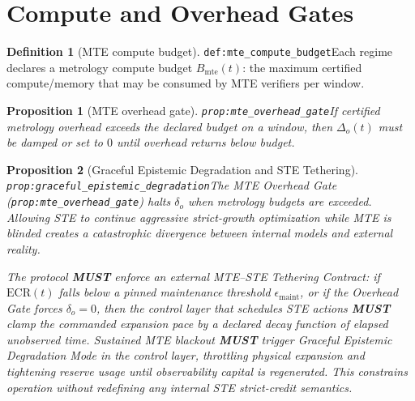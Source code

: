 \documentclass[11pt]{article}
\theoremstyle{definition}
\newtheorem{definition}{Definition}
\theoremstyle{plain}
\newtheorem{proposition}{Proposition}
\newcommand{\MUST}{\textbf{MUST}}
\newcommand{\STE}{\textsf{STE}}
\newcommand{\lbl}[1]{\texttt{\footnotesize\nolinkurl{#1}}}
\newcommand{\DefLabel}[1]{\hfill{\small\lbl{#1}}}
\newcommand{\deltao}{\Delta_o}
\begin{document}
\section{Compute and Overhead Gates}\label{sec:overhead}
\begin{definition}[MTE compute budget]\DefLabel{def:mte_compute_budget}\label{def:mte_compute_budget}
Each regime declares a metrology compute budget $B_{\mathrm{mte}}(t)$: the maximum certified compute/memory that may be consumed by MTE verifiers per window.
\end{definition}

\begin{proposition}[MTE overhead gate]\DefLabel{prop:mte_overhead_gate}\label{prop:mte_overhead_gate}
If certified metrology overhead exceeds the declared budget on a window, then $\deltao(t)$ must be damped or set to $0$ until overhead returns below budget.
\end{proposition}

\begin{proposition}[Graceful Epistemic Degradation and \STE{} Tethering]\DefLabel{prop:graceful_epistemic_degradation}\label{prop:graceful_epistemic_degradation}
The MTE Overhead Gate (\lbl{prop:mte_overhead_gate}) halts $\delta_o$ when metrology budgets are exceeded.
Allowing \STE{} to continue aggressive strict-growth optimization while MTE is blinded creates a catastrophic divergence between internal models and external reality.

The protocol \MUST{} enforce an external \emph{MTE--STE Tethering Contract}: if $\mathrm{ECR}(t)$ falls below a pinned maintenance threshold $\epsilon_{\mathrm{maint}}$, or if the Overhead Gate forces $\delta_o = 0$, then the control layer that schedules \STE{} actions \MUST{} clamp the commanded expansion pace by a declared decay function of elapsed unobserved time.
Sustained MTE blackout \MUST{} trigger \emph{Graceful Epistemic Degradation Mode} in the control layer, throttling physical expansion and tightening reserve usage until observability capital is regenerated. This constrains operation without redefining any internal \STE{} strict-credit semantics.
\end{proposition}

\end{document}
